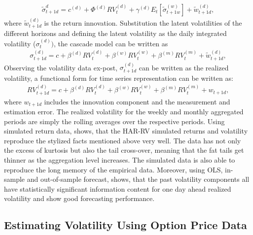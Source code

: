 \begin{align*}
\tilde{\sigma}_{t+1d}^{d} = c^{(d)} + \Phi^{(d)} RV_{t}^{(d)} + \gamma^{(d)} E_{t}[\tilde{\sigma}_{t+1w}^{(w)}] + \tilde{w}_{t+1d}^{(d)},
\end{align*}
where $\tilde{w}_{t+1d}^{(d)}$ is the return innovation. Substitution the latent volatilities of the different horizons and defining the latent volatility as the daily integrated volatility ($\sigma_{t}^{(d)})$, the cascade model can be written as
\begin{align}\label{eq:cascade-model}
\sigma_{t+1d}^{(d)} = c + \beta^{(d)} RV_{t}^{(d)} + \beta^{(w)} RV_{t}^{(w)} + \beta^{(m)} RV_{t}^{(m)} + \tilde{w}_{t+1d}^{(d)},
\end{align}
Observing the volatility data ex-post, $\sigma_{t+1d}^{(d)}$ can be written as the realized volatility, a functional form for time series representation can be written as:
\begin{align}\label{eq:time-series-model}
RV_{t+1d}^{(d)} = c + \beta^{(d)} RV_{t}^{(d)} + \beta^{(w)} RV_{t}^{(w)} + \beta^{(m)} RV_{t}^{(m)} + w_{t+1d} ,
\end{align}
where $w_{t+1d}$ includes the innovation component and the measurement and estimation error. The realized volatility for the weekly and monthly aggregated periods are simply the rolling averages over the respective periods.
Using simulated return data, \textcite{corsi2009} shows, that the HAR-RV simulated returns and volatility reproduce the stylized facts mentioned above very well. The data has not only the excess of kurtosis but also the tail cross-over, meaning that the fat tails get thinner as the aggregation level increases. The simulated data is also able to reproduce the long memory of the empirical data. Moreover, using OLS, in-sample and out-of-sample forecast, \textcite{corsi2009} shows, that the past volatility components all have statistically significant information content for one day ahead realized volatility and show good forecasting performance.

\subsection{Estimating Volatility Using Option Price Data}
